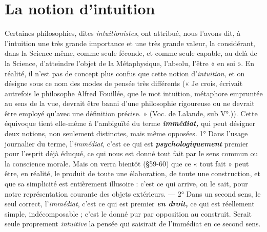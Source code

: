 \section{La notion d’intuition}%
Certaines philosophies, dites {\it intuitionistes},
ont attribué, nous l'avons dit, à l'intuition une très grande
importance et une très grande valeur, la considérant, dans la Science
même, comme seule féconde, et comme seule capable, au delà de la
Science, d'atteindre l’objet de la Métaphysique, l'absolu, l'être « en
soi ». En réalité, il n’est pas de concept plus confus que cette notion
d’{\it intuition}, et on désigne sous ce nom des modes de pensée très différents
{\scriptsize (« Je crois, écrivait autrefois le philosophe Alfred Fouillée, que le mot intuition,
métaphore empruntée au sens de la vue, devrait être banni d’une philosophie rigoureuse
ou ne devrait être employé qu'avec une définition précise. » (Voc. de Lalande, sub V°.))}.
Cette équivoque tient elle-même à l'ambiguïté du terme
\textbf{\textit {immédiat,}} qui peut désigner deux notions, non seulement distinctes,
mais même opposées. 1° Dans l’usage journalier du terme, l'{\it immédiat},
c'est ce qui est \textbf{\textit {psychologiquement}} premier pour l'esprit déjà éduqué,
ce qui nous est donné tout fait par le sens commun ou la conscience
morale. Mais on verra bientôt (\S 59-60) que ce « tout fait » peut être,
en réalité, le produit de toute une élaboration, de toute une construction,
et que sa simplicité est entièrement illusoire : c’est ce qui arrive,
on le sait, pour notre représentation courante des objets extérieurs.
— 2° Dans un second sens, le seul correct, l'{\it immédiat}, c’est ce qui est
premier \textbf{\textit {en droit,}} ce qui est réellement simple, indécomposable ; c’est
le donné pur par opposition au construit. Serait seule proprement
{\it intuitive} la pensée qui saisirait de l'immédiat en ce second sens.

